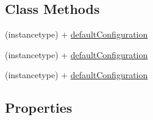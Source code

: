 \subsection*{Class Methods}
\begin{DoxyCompactItemize}
\item 
(instancetype) + \mbox{\hyperlink{interface_k_v_n_progress_configuration_ac66fdbe5c485d14e39ac25a1b89a901f}{default\+Configuration}}
\item 
(instancetype) + \mbox{\hyperlink{interface_k_v_n_progress_configuration_ac66fdbe5c485d14e39ac25a1b89a901f}{default\+Configuration}}
\item 
(instancetype) + \mbox{\hyperlink{interface_k_v_n_progress_configuration_ac66fdbe5c485d14e39ac25a1b89a901f}{default\+Configuration}}
\end{DoxyCompactItemize}
\subsection*{Properties}
